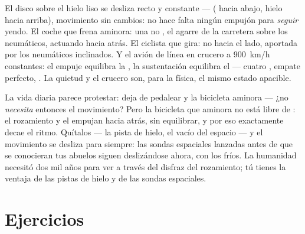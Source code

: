 \begin{example}\label{ex:g9:uniform-varied-motion:reading}
El disco sobre el hielo liso se desliza recto y constante ---
  ( hacia abajo, hielo hacia
arriba), movimiento sin cambios: no hace falta ningún empujón para
\emph{seguir} yendo. El coche que frena aminora: una
 no , el agarre de la carretera sobre los
neumáticos, actuando hacia atrás. El ciclista que gira:
 no  hacia el lado, aportada por los neumáticos
inclinados. Y el avión de línea en crucero a \qty{900}{km/h} constantes:
el empuje equilibra la , la sustentación equilibra el
 --- cuatro , empate perfecto,
. La quietud y el crucero son, para la física,
el mismo estado apacible.
\end{example}

\begin{remark}\label{rem:g9:uniform-varied-motion:surprise}
La vida diaria parece protestar: deja de pedalear y la bicicleta
aminora --- ¿no \emph{necesita} entonces  el movimiento?
Pero la bicicleta que aminora no está libre de : el rozamiento y
el  empujan hacia atrás, sin equilibrar, y por eso exactamente
decae el ritmo. Quítalos --- la pista de hielo, el vacío del espacio ---
y el movimiento se desliza para siempre: las sondas espaciales lanzadas
antes de que se conocieran tus abuelos siguen deslizándose ahora, con
los  fríos. La humanidad necesitó dos mil años para ver a través
del disfraz del rozamiento; tú tienes la ventaja de las pistas de hielo
y de las sondas espaciales.
\end{remark}

\section{Ejercicios}

